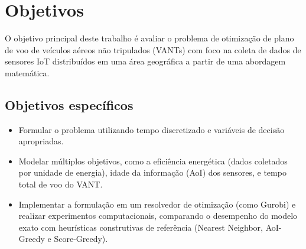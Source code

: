 \chapter{Objetivos}
\label{sec:objetivos}

O objetivo principal deste trabalho é avaliar o problema de otimização de plano de voo de veículos aéreos não tripulados (VANTs) com foco na coleta de dados de sensores IoT distribuídos em uma área geográfica a partir de uma abordagem matemática.

\section*{Objetivos específicos}

\begin{itemize}
    \item Formular o problema utilizando tempo discretizado e variáveis de decisão apropriadas.
    \item Modelar múltiplos objetivos, como a eficiência energética (dados coletados por unidade de energia), idade da informação (AoI) dos sensores, e tempo total de voo do VANT.
    \item Implementar a formulação em um resolvedor de otimização (como Gurobi) e realizar experimentos computacionais, comparando o desempenho do modelo exato com heurísticas construtivas de referência (Nearest Neighbor, AoI-Greedy e Score-Greedy).
\end{itemize}
